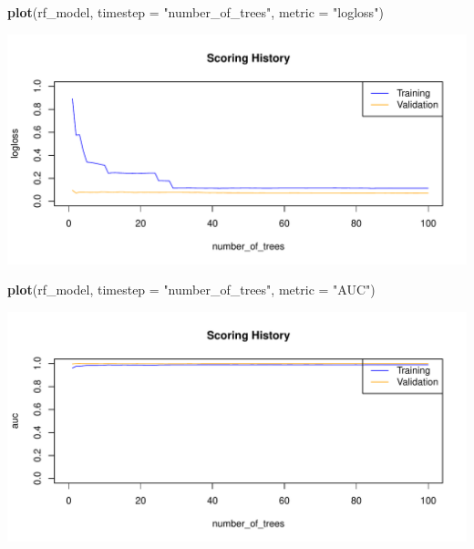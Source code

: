 \documentclass[]{article}
\newenvironment{Shaded}{\begin{snugshade}}{\end{snugshade}}
\newcommand{\KeywordTok}[1]{\textcolor[rgb]{0.13,0.29,0.53}{\textbf{{#1}}}}
\newcommand{\DataTypeTok}[1]{\textcolor[rgb]{0.13,0.29,0.53}{{#1}}}
\newcommand{\StringTok}[1]{\textcolor[rgb]{0.31,0.60,0.02}{{#1}}}
\newcommand{\NormalTok}[1]{{#1}}
\begin{document}
\begin{Shaded}
\begin{Highlighting}[]
\KeywordTok{plot}\NormalTok{(rf_model,}
     \DataTypeTok{timestep =} \StringTok{"number_of_trees"}\NormalTok{,}
     \DataTypeTok{metric =} \StringTok{"logloss"}\NormalTok{)}
\end{Highlighting}
\end{Shaded}

\begin{center}\includegraphics{webinar_code_files/figure-latex/unnamed-chunk-46-1} \end{center}

\begin{Shaded}
\begin{Highlighting}[]
\KeywordTok{plot}\NormalTok{(rf_model,}
     \DataTypeTok{timestep =} \StringTok{"number_of_trees"}\NormalTok{,}
     \DataTypeTok{metric =} \StringTok{"AUC"}\NormalTok{)}
\end{Highlighting}
\end{Shaded}

\begin{center}\includegraphics{webinar_code_files/figure-latex/unnamed-chunk-47-1} \end{center}
\end{document}
